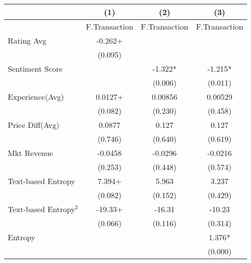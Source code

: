\begin{table}[]
\centering
\begin{tabular}{@{}lccc@{}}
\toprule
                                         & (1)           & (2)           & (3)           \\ \midrule
                                         & F.Transaction & F.Transaction & F.Transaction \\
Rating Avg                               & -0.262+       &               &               \\
                                         & (0.095)       &               &               \\
Sentiment Score                          &               & -1.322*       & -1.215*       \\
                                         &               & (0.006)       & (0.011)       \\
Experience(Avg)                          & 0.0127+       & 0.00856       & 0.00529       \\
                                         & (0.082)       & (0.230)       & (0.458)       \\
Price Diff(Avg)                          & 0.0877        & 0.127         & 0.127         \\
                                         & (0.746)       & (0.640)       & (0.619)       \\
Mkt Revenue                              & -0.0458       & -0.0296       & -0.0216       \\
                                         & (0.253)       & (0.448)       & (0.574)       \\
Text-based Entropy                       & 7.394+        & 5.963         & 3.237         \\
                                         & (0.082)       & (0.152)       & (0.429)       \\
Text-based Entropy$^2$ & -19.33+       & -16.31        & -10.23        \\
                                         & (0.066)       & (0.116)       & (0.314)       \\
Entropy                                  &               &               & 1.376*        \\
                                         &               &               & (0.000)       \\

\end{tabular}
\end{table}
